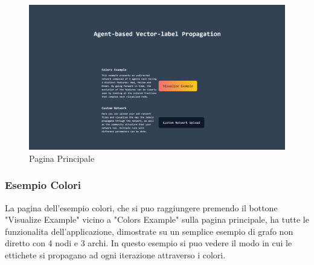 \documentclass[a4paper,12pt]{report}
\begin{document}
			\begin{center}
			\begin{figure}[H]
			\centering
			\includegraphics[width=0.9\linewidth,keepaspectratio]{paginaprincipale}
			\caption{Pagina Principale}
			\end{figure}
			\end{center}

			\subsubsection{Esempio Colori}

			La pagina dell'esempio colori, che si puo raggiungere premendo il bottone "Visualize Example" vicino a "Colors Example" sulla pagina principale, ha tutte le funzionalita dell'applicazione, dimostrate su un semplice esempio di grafo non diretto con 4 nodi e 3 archi. In questo esempio si puo vedere il modo in cui le ettichete si propagano ad ogni iterazione attraverso i colori. 
\end{document}
